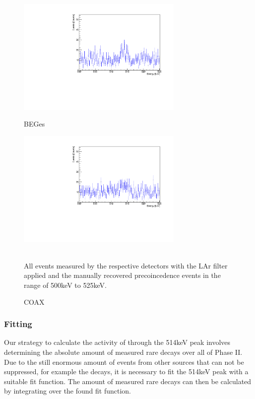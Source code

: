 \begin{figure}[t!]
\centering
\begin{minipage}{.5\textwidth}
  \centering
	\includegraphics[width=80mm]{./Bilder/500525LArVetoBEGesEventList.pdf}
    \caption{BEGes}
  \label{fig:LArBEGesEV}
\end{minipage}%
\begin{minipage}{.5\textwidth}
  \centering
	\includegraphics[width=80mm]{./Bilder/500525LArVetoCOAXEventList.pdf}
  \caption{COAX}
  \label{fig:LArCOAXEV}
\end{minipage}
    \\
	\vspace{0.5cm}
    All events measured by the respective detectors with the LAr filter applied and the manually recovered precoincedence events in the range of 500keV to 525keV.
\end{figure}

\subsubsection{Fitting}
\label{sec:Fitting}

Our strategy to calculate the activity of  through the 514keV peak involves determining the absolute amount of measured rare  decays over all of Phase II.
Due to the still enormous amount of events from other sources that can not be suppressed, for example the  decays, it is necessary to fit the 514keV peak with a suitable fit function.
The amount of measured rare  decays can then be calculated by integrating over the found fit function.
\\

